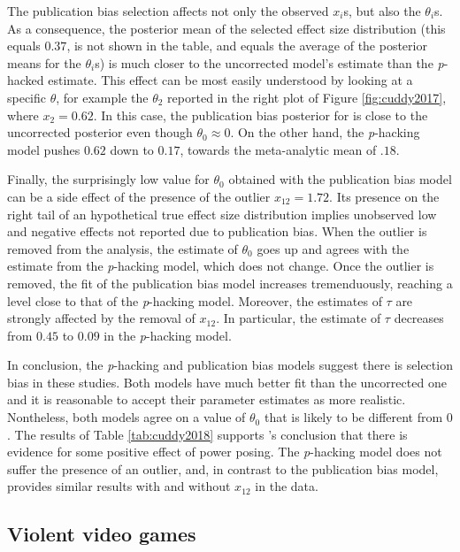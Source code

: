 \documentclass{article}
\theoremstyle{plain}
\theoremstyle{definition}
\begin{document}
The publication bias selection affects not only the observed $x_{i}$s, but also the $\theta_{i}$s. As a consequence, the posterior mean of the selected effect size distribution (this equals $0.37$, is not shown in the table, and equals the average of the posterior means for the $\theta_{i}$s) is much closer to the uncorrected model's estimate than the \textit{p}-hacked estimate. This effect can be most easily understood by looking at a specific $\theta$, for example the $\theta_2$ reported in the right plot of Figure \ref{fig:cuddy2017}, where $x_{2}=0.62$. In this case, the publication bias posterior for is close to the uncorrected posterior even though $\theta_0 \approx 0$. On the other hand, the \textit{p}-hacking model pushes $0.62$ down to $0.17$, towards the meta-analytic mean of $.18$.

Finally, the surprisingly low value for $\theta_0$ obtained with the publication bias model can be a side effect of the presence of the outlier $x_{12} = 1.72$. Its presence on the right tail of an hypothetical true effect size distribution implies unobserved low and negative effects not reported due to publication bias. When the outlier is removed from the analysis, the estimate of $\theta_{0}$ goes up and agrees with the estimate from the \textit{p}-hacking model, which does not change. Once the outlier is removed, the fit of the publication bias model increases tremenduously, reaching a level close to that of the \textit{p}-hacking model. Moreover, the estimates of $\tau$ are strongly affected by the removal of $x_{12}$. In particular, the estimate of $\tau$ decreases from $0.45$ to $0.09$ in the \textit{p}-hacking model.



In conclusion, the \textit{p}-hacking and publication bias models suggest there is selection bias in these studies. Both models have much better fit than the uncorrected one and it is reasonable to accept their parameter estimates as more realistic. Nontheless, both models agree on a value of $\theta_{0}$ that is likely to be different from $0$. The results of Table \ref{tab:cuddy2018} supports \citet{cuddy2018p}'s conclusion that there is evidence for some positive effect of power posing. The \textit{p}-hacking model does not suffer the presence of an outlier, and, in contrast to the publication bias model, provides similar results with and without $x_{12}$ in the data.

\subsection{Violent video games\label{subsec:Anderson}}
\end{document}
